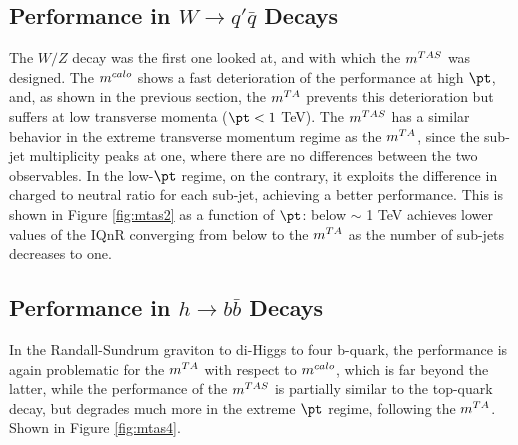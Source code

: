 
\subsection{Performance in $W \to q'\bar{q}$ Decays}
The $W/Z$ decay was the first one looked at, and with which the $m^{TAS}$ was designed. The $m^{calo}$ shows a fast deterioration of the performance at high $\pt$, and, as shown in the previous section, the $m^{TA}$ prevents this deterioration but suffers at low transverse momenta ($\pt<1$ TeV).
The $m^{TAS}$ has a similar behavior in the extreme transverse momentum regime as the $m^{TA}$, since the sub-jet multiplicity peaks at one, where there are no differences between the two observables.
In the low-$\pt$ regime, on the contrary, it exploits the difference in charged to neutral ratio for each sub-jet, achieving a better performance.
This is shown in Figure \ref{fig:mtas2} as a function of $\pt$: below $\sim$ 1 TeV achieves lower values of the IQnR converging from below to the $m^{TA}$ as the number of sub-jets decreases to one.



\subsection{Performance in $h\to b\bar{b}$ Decays}
In the Randall-Sundrum graviton to di-Higgs to four b-quark, the performance is again problematic for the $m^{TA}$ with respect to $m^{calo}$, which is far beyond the latter, while the performance of the $m^{TAS}$ is partially similar to the top-quark decay, but degrades much more in the extreme $\pt$ regime, following the $m^{TA}$. Shown in Figure \ref{fig:mtas4}.

